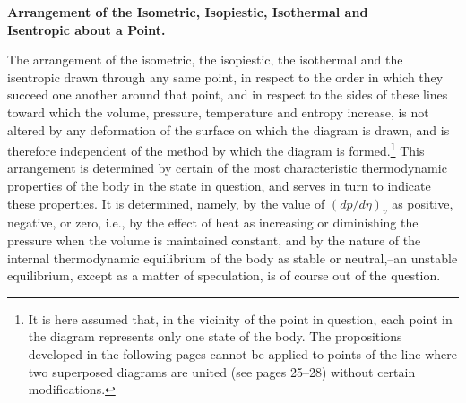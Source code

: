 \documentclass[11pt]{article}
\begin{document}
\begin{center}
\bfseries Arrangement of the Isometric, Isopiestic, Isothermal and\\ Isentropic about a Point.
\end{center}

The arrangement of the isometric, the isopiestic, the isothermal and the isentropic drawn through any same point, in respect to the order in which they succeed one another around that point, and in respect to the sides of these lines toward which the volume, pressure, temperature and entropy increase, is not altered by any deformation of the surface on which the diagram is drawn, and is therefore independent of the method by which the diagram is formed.\footnote{It is here assumed that, in the vicinity of the point in question, each point in the diagram represents only one state of the body. The propositions developed in the following pages cannot be applied to points of the line where two superposed diagrams are united (see pages 25--28) without certain modifications.} This arrangement is determined by certain of the most characteristic thermodynamic properties of the body in the state in question, and serves in turn to indicate these properties. It is determined, namely, by the value of $\left(dp/d\eta\right)_v$ as positive, negative, or zero, i.e., by the effect of heat as increasing or diminishing the pressure when the volume is maintained constant, and by the nature of the internal thermodynamic equilibrium of the body as stable or neutral,--an unstable equilibrium, except as a matter of speculation, is of course out of the question.
\end{document}
